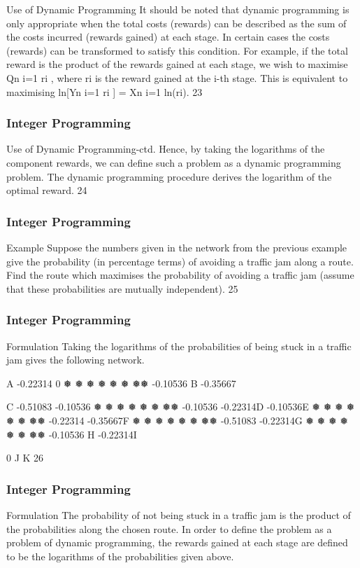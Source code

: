 \begin{frame}
Use of Dynamic Programming
It should be noted that dynamic programming is only appropriate
when the total costs (rewards) can be described as the sum of the
costs incurred (rewards gained) at each stage.
In certain cases the costs (rewards) can be transformed to satisfy
this condition. For example, if the total reward is the product of
the rewards gained at each stage, we wish to maximise Qn
i=1 ri
,
where ri
is the reward gained at the i-th stage.
This is equivalent to maximising
ln[Yn
i=1
ri
] = Xn
i=1
ln(ri).
23 \end{frame}  \begin{frame} \frametitle{Integer Programming}     
Use of Dynamic Programming-ctd.
Hence, by taking the logarithms of the component rewards, we can
define such a problem as a dynamic programming problem.
The dynamic programming procedure derives the logarithm of the
optimal reward.
24 \end{frame}  \begin{frame} \frametitle{Integer Programming}     
Example
Suppose the numbers given in the network from the previous
example give the probability (in percentage terms) of avoiding a
traffic jam along a route. Find the route which maximises the
probability of avoiding a traffic jam (assume that these
probabilities are mutually independent).
25 \end{frame}  \begin{frame} \frametitle{Integer Programming}     
Formulation
Taking the logarithms of the probabilities of being stuck in a traffic
jam gives the following network.







A
-0.22314
0
❅
❅
❅
❅
❅
❅
❅❅
-0.10536
B -0.35667







C
-0.51083
-0.10536
❅
❅
❅
❅
❅
❅
❅❅
-0.10536
-0.22314D
-0.10536E
❅
❅
❅
❅
❅
❅
❅❅
-0.22314
-0.35667F
❅
❅
❅
❅
❅
❅
❅❅
-0.51083
-0.22314G
❅
❅
❅
❅
❅
❅
❅❅
-0.10536
H
-0.22314I







0
J
K
26 
\end{frame}  
\begin{frame} 
\frametitle{Integer Programming}     
Formulation
The probability of not being stuck in a traffic jam is the product of
the probabilities along the chosen route.
In order to define the problem as a problem of dynamic
programming, the rewards gained at each stage are defined to be
the logarithms of the probabilities given above.
\end{frame}  

